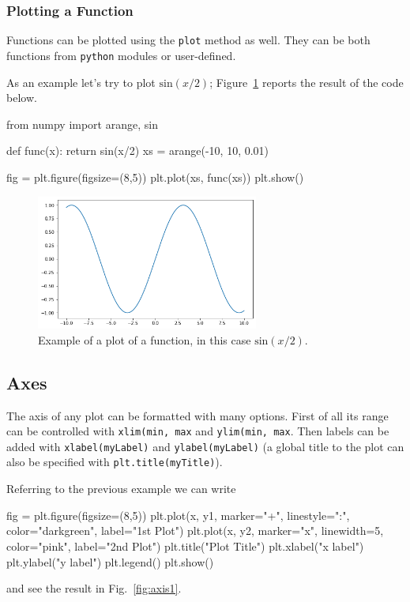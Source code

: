 \subsubsection{Plotting a Function}\label{plotting-a-function}

Functions can be plotted using the \texttt{plot} method as well. They can be both functions from \texttt{python} modules or user-defined.

As an example let's try to plot $\mathrm{sin}(x/2)$; Figure~\ref{fig:sinx_x} reports the result of the code below.

\begin{ipythonnon}
from numpy import arange, sin

def func(x):
    return sin(x/2)
xs = arange(-10, 10, 0.01)

fig = plt.figure(figsize=(8,5))
plt.plot(xs, func(xs))
plt.show()
\end{ipythonnon}

\begin{figure}[htb]
	\centering
	\includegraphics[width=0.65\textwidth]{figures/sinx_x}
	\caption{Example of a plot of a function, in this case \(\mathrm{sin}(x/2)\).}
	\label{fig:sinx_x}
\end{figure}

\subsection{Axes}\label{axes}

The axis of any plot can be formatted with many options.
First of all its range can be controlled with \texttt{xlim(min, max} and \texttt{ylim(min, max}. Then labels can be added with \texttt{xlabel(myLabel)} and \texttt{ylabel(myLabel)} (a global title to the plot can also be specified with \texttt{plt.title(myTitle)}).

Referring to the previous example we can write

\begin{ipythonnon}
fig = plt.figure(figsize=(8,5))
plt.plot(x, y1, marker="+", linestyle=":", color="darkgreen", label="1st Plot")
plt.plot(x, y2, marker="x", linewidth=5, color="pink", label="2nd Plot")
plt.title("Plot Title")
plt.xlabel("x label")
plt.ylabel("y label")
plt.legend()
plt.show()
\end{ipythonnon}
\noindent
and see the result in Fig.~\ref{fig:axis1}.

